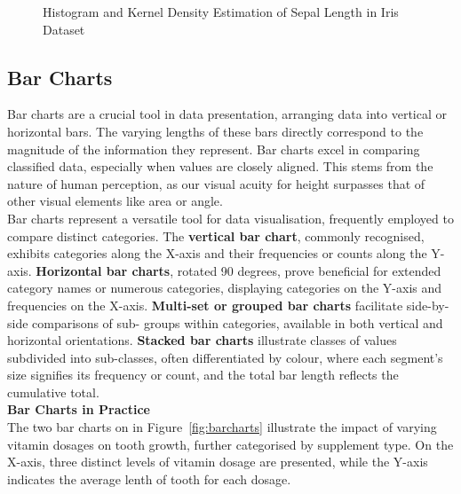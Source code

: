 \documentclass{article}\usepackage[]{graphicx}\usepackage[]{xcolor}
\newenvironment{knitrout}{}{} %
\numberwithin{equation}{section}
\begin{document}
\begin{figure}[htbp]
\begin{minipage}[b]{0.48\linewidth}
\begin{knitrout}
{}


\end{knitrout}
  \end{minipage}
  \caption{Histogram and Kernel Density Estimation of Sepal Length in Iris Dataset}
  \label{fig:iris-plots}
\end{figure}

\subsection{Bar Charts}
\noindent Bar charts are a crucial tool in data presentation, arranging data into vertical or horizontal bars. The varying lengths of these bars directly correspond to the magnitude of the information they represent. Bar charts excel in comparing classified data, especially when values are closely aligned. This stems from the nature of human perception, as our visual acuity for height surpasses that of other visual elements like area or angle.\\

\noindent Bar charts represent a versatile tool for data visualisation, frequently employed to compare distinct categories. The \textbf{vertical bar chart}, commonly recognised, exhibits categories along the X-axis and their frequencies or counts along the Y-axis. \textbf{Horizontal bar charts}, rotated 90 degrees, prove beneficial for extended category names or numerous categories, displaying categories on the Y-axis and frequencies on the X-axis. \textbf{Multi-set or grouped bar charts} facilitate side-by-side comparisons of sub- groups within categories, available in both vertical and horizontal orientations. \textbf{Stacked bar charts} illustrate classes of values subdivided into sub-classes, often differentiated by colour, where each segment's size signifies its frequency or count, and the total bar length reflects the cumulative total.\\

\noindent \textbf{Bar Charts in Practice}\\
\noident The two bar charts on in Figure~\ref{fig:barcharts} illustrate the impact of varying vitamin dosages on tooth growth, further categorised by supplement type. On the X-axis, three distinct levels of vitamin dosage are presented, while the Y-axis indicates the average lenth of tooth for each dosage.
\end{document}
